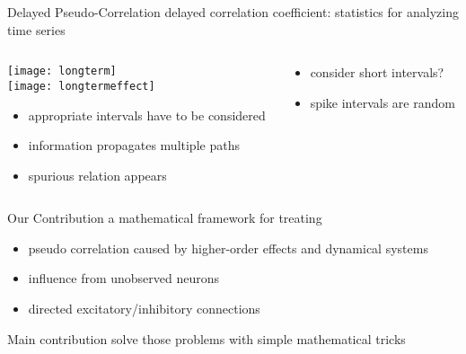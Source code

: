 \documentclass[fleqn,aspectratio=1610]{beamer}
\begin{document}
\begin{frame}[label={sec:org1287d2d}]{Delayed Pseudo-Correlation}
delayed correlation coefficient:
statistics for analyzing time series

\medskip
\begin{columns}
\begin{column}[t]{0.5\columnwidth}
\centering
\texttt{[image: longterm]}\\[0pt]
\texttt{[image: longtermeffect]}
\begin{itemize}
\item appropriate intervals have to be considered
\item information propagates multiple paths
\item spurious relation appears
\end{itemize}
\end{column}
\begin{column}[t]{0.5\columnwidth}
\centering
{}
\begin{itemize}
\item <2-> consider short intervals?
\end{itemize}
\begin{itemize}
\item <3-> spike intervals are random
\end{itemize}
\end{column}
\end{columns}
\end{frame}

\begin{frame}[label={sec:org138d0f5}]{Our Contribution}
\nocite{Iwasaki_etal2018}
a mathematical framework for treating

\begin{itemize}
\item pseudo correlation caused by 
higher-order effects and dynamical systems
\item influence from unobserved neurons
\item directed excitatory/inhibitory connections
\end{itemize}

\pause
\bigskip
\begin{alertblock}{Main contribution}
solve those problems with simple mathematical tricks
\end{alertblock}
\end{frame}
\end{document}
